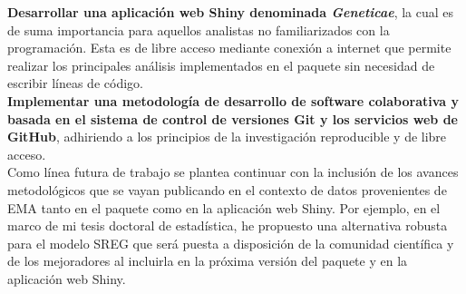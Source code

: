 \textbf{Desarrollar una aplicación web Shiny denominada \emph{Geneticae}}, la cual es de suma importancia para aquellos analistas no familiarizados con la programación. Esta es de libre acceso mediante conexión a internet que permite realizar los principales análisis implementados en el paquete sin necesidad de escribir líneas de código. \\

\textbf{Implementar una metodología de desarrollo de software colaborativa y basada en el sistema de control de versiones Git y los servicios web de GitHub}, adhiriendo a los principios de la investigación reproducible y de libre acceso.\\

Como línea futura de trabajo se plantea continuar con la inclusión de los avances metodológicos que se vayan publicando en el contexto de datos provenientes de EMA tanto en el paquete como en la aplicación web Shiny. Por ejemplo, en el marco de mi tesis doctoral de estadística, he propuesto una alternativa robusta para el modelo SREG \citep{Angelinietal2022} que será puesta a disposición de la comunidad científica y de los mejoradores al incluirla en la próxima versión del paquete y en la aplicación web Shiny.




